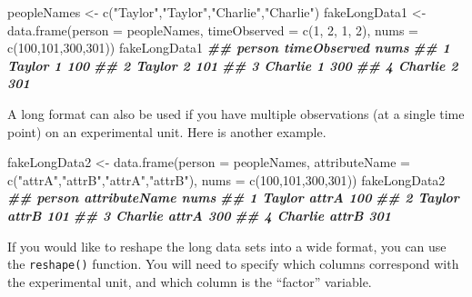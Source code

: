 \documentclass[
  12pt,
  krantz2]{krantz}
\makeatletter
\newenvironment{Shaded}{\begin{snugshade}}{\end{snugshade}}
\newcommand{\AttributeTok}[1]{\textcolor[rgb]{0.61,0.61,0.61}{#1}}
\newcommand{\DecValTok}[1]{\textcolor[rgb]{0.06,0.06,0.06}{#1}}
\newcommand{\DocumentationTok}[1]{\textcolor[rgb]{0.37,0.37,0.37}{\textbf{\textit{#1}}}}
\newcommand{\FunctionTok}[1]{\textcolor[rgb]{0,0,0}{#1}}
\newcommand{\NormalTok}[1]{#1}
\newcommand{\OtherTok}[1]{\textcolor[rgb]{0.37,0.37,0.37}{#1}}
\newcommand{\StringTok}[1]{\textcolor[rgb]{0.5,0.5,0.5}{#1}}
\newenvironment{kframe}{%
\medskip{}
\setlength{\fboxsep}{.8em}
 \def\at@end@of@kframe{}%
 \ifinner\ifhmode%
  \def\at@end@of@kframe{\end{minipage}}%
  \begin{minipage}{\columnwidth}%
 \fi\fi%
 \def\FrameCommand##1{\hskip\@totalleftmargin \hskip-\fboxsep
 \colorbox{shadecolor}{##1}\hskip-\fboxsep
     \hskip-\linewidth \hskip-\@totalleftmargin \hskip\columnwidth}%
 \MakeFramed {\advance\hsize-\width
   \@totalleftmargin\z@ \linewidth\hsize
   \@setminipage}}%
 {\par\unskip\endMakeFramed%
 \at@end@of@kframe}
\renewenvironment{Shaded}{\begin{kframe}}{\end{kframe}}
\makeatother
\begin{document}
\begin{Shaded}
\begin{Highlighting}[]
\NormalTok{peopleNames }\OtherTok{\textless{}{-}} \FunctionTok{c}\NormalTok{(}\StringTok{"Taylor"}\NormalTok{,}\StringTok{"Taylor"}\NormalTok{,}\StringTok{"Charlie"}\NormalTok{,}\StringTok{"Charlie"}\NormalTok{)}
\NormalTok{fakeLongData1 }\OtherTok{\textless{}{-}} \FunctionTok{data.frame}\NormalTok{(}\AttributeTok{person =}\NormalTok{ peopleNames, }
                             \AttributeTok{timeObserved =} \FunctionTok{c}\NormalTok{(}\DecValTok{1}\NormalTok{, }\DecValTok{2}\NormalTok{, }\DecValTok{1}\NormalTok{, }\DecValTok{2}\NormalTok{),}
                             \AttributeTok{nums =} \FunctionTok{c}\NormalTok{(}\DecValTok{100}\NormalTok{,}\DecValTok{101}\NormalTok{,}\DecValTok{300}\NormalTok{,}\DecValTok{301}\NormalTok{))}
\NormalTok{fakeLongData1}
\DocumentationTok{\#\#    person timeObserved nums}
\DocumentationTok{\#\# 1  Taylor            1  100}
\DocumentationTok{\#\# 2  Taylor            2  101}
\DocumentationTok{\#\# 3 Charlie            1  300}
\DocumentationTok{\#\# 4 Charlie            2  301}
\end{Highlighting}
\end{Shaded}

A long format can also be used if you have multiple observations (at a single time point) on an experimental unit. Here is another example.

\begin{Shaded}
\begin{Highlighting}[]
\NormalTok{fakeLongData2 }\OtherTok{\textless{}{-}} \FunctionTok{data.frame}\NormalTok{(}\AttributeTok{person =}\NormalTok{ peopleNames, }
                             \AttributeTok{attributeName =} \FunctionTok{c}\NormalTok{(}\StringTok{"attrA"}\NormalTok{,}\StringTok{"attrB"}\NormalTok{,}\StringTok{"attrA"}\NormalTok{,}\StringTok{"attrB"}\NormalTok{),}
                             \AttributeTok{nums =} \FunctionTok{c}\NormalTok{(}\DecValTok{100}\NormalTok{,}\DecValTok{101}\NormalTok{,}\DecValTok{300}\NormalTok{,}\DecValTok{301}\NormalTok{))}
\NormalTok{fakeLongData2}
\DocumentationTok{\#\#    person attributeName nums}
\DocumentationTok{\#\# 1  Taylor         attrA  100}
\DocumentationTok{\#\# 2  Taylor         attrB  101}
\DocumentationTok{\#\# 3 Charlie         attrA  300}
\DocumentationTok{\#\# 4 Charlie         attrB  301}
\end{Highlighting}
\end{Shaded}

If you would like to reshape the long data sets into a wide format, you can use the \texttt{reshape()} function. You will need to specify which columns correspond with the experimental unit, and which column is the ``factor'' variable.
\end{document}
